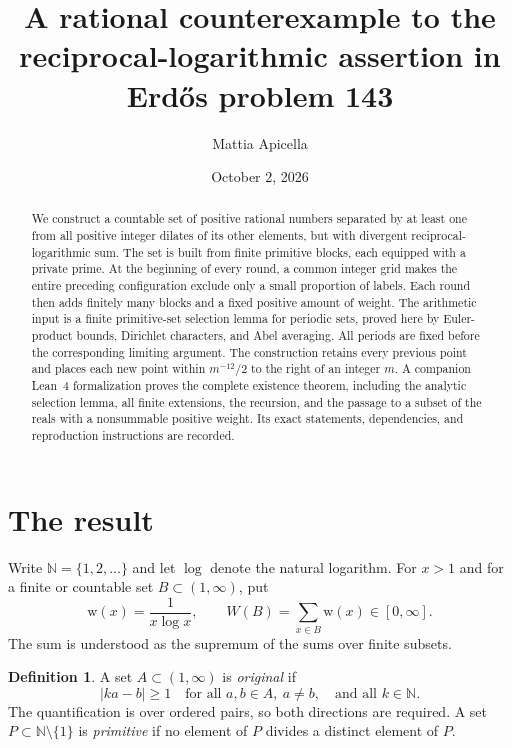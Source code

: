 \documentclass[11pt,reqno]{amsart}
\title[A rational counterexample for Erd\H{o}s problem 143]{A rational counterexample to the reciprocal-logarithmic assertion in Erd\H{o}s problem 143}
\author{Mattia Apicella}
\date{October 2, 2026}
\theoremstyle{definition}
\newtheorem{definition}[theorem]{Definition}
\theoremstyle{remark}
\numberwithin{equation}{section}
\newcommand{\N}{\mathbb N}
\newcommand{\wt}{\mathrm w}
\newcommand{\abs}[1]{\lvert #1\rvert}
\begin{document}
\begin{abstract}
We construct a countable set of positive rational
numbers separated by at least one from all positive integer dilates of its
other elements, but with divergent reciprocal-logarithmic sum. The
set is built from finite primitive blocks, each equipped with a private
prime. At the beginning of every round, a common integer grid makes the
entire preceding configuration exclude only a small proportion of labels.
Each round then adds finitely many blocks and a fixed positive amount of
weight. The arithmetic input is a finite primitive-set selection lemma for
periodic sets, proved here by Euler-product bounds, Dirichlet characters,
and Abel averaging. All periods are fixed before
the corresponding limiting argument. The construction retains every
previous point and places each new point within $m^{-12}/2$ to the right of
an integer $m$. A companion Lean~4 formalization proves the complete
existence theorem, including the analytic selection lemma, all finite
extensions, the recursion, and the passage to a subset of the reals with
a nonsummable positive weight. Its exact statements, dependencies, and
reproduction instructions are recorded.
\end{abstract}
\maketitle

\section{The result}
\label{sec:introduction}

Write $\N=\{1,2,\ldots\}$ and let $\log$ denote the natural logarithm.
For $x>1$ and for a finite or countable set $B\subset(1,\infty)$, put
\[
 \wt(x)=\frac1{x\log x},\qquad
 W(B)=\sum_{x\in B}\wt(x)\in[0,\infty].
\]
The sum is understood as the supremum of the sums over finite subsets.

\begin{definition}
A set $A\subset(1,\infty)$ is \emph{original} if
\begin{equation}\label{eq:original}
 \abs{ka-b}\geq1
 \quad\text{for all }a,b\in A,\ a\ne b,\quad
 \text{and all }k\in\N.
\end{equation}
The quantification is over ordered pairs, so both directions are required.
A set $P\subset\N\setminus\{1\}$ is \emph{primitive} if no element of $P$
divides a distinct element of $P$.
\end{definition}
\end{document}
